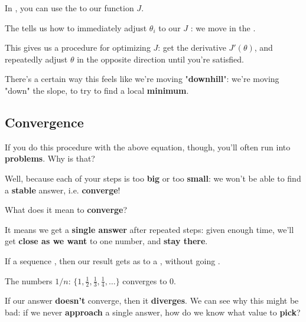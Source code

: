         \begin{concept}
            In , you can use the  to  our function $J$.
            
            The  tells us how to immediately adjust $\theta_i$ to  our $J$ : we move in the .
        \end{concept}
        
        This gives us a procedure for optimizing $J$: get the derivative $J'(\theta)$, and repeatedly adjust $\theta$ in the opposite direction until you're satisfied.
        
        There's a certain way this feels like we're moving "\textbf{downhill}": we're moving "down" the slope, to try to find a local \textbf{minimum}.
        
    \subsection{Convergence}
    
        If you do this procedure with the above equation, though, you'll often run into \textbf{problems}. Why is that?
        
        Well, because each of your steps is too \textbf{big} or too \textbf{small}: we won't be able to find a \textbf{stable} answer, i.e. \textbf{converge}!
        
        What does it mean to \textbf{converge}? 
        
        It means we get a \textbf{single answer} after repeated steps: given enough time, we'll get \textbf{close as we want} to one number, and \textbf{stay there}.\\
        
        \begin{definition}
            If a sequence , then our result gets as  to a , without going .
        \end{definition}
        
        \miniex The numbers $1/n$: $\{ 1, \frac{1}{2}, \frac{1}{3}, \frac{1}{4}, \dots  \}$ converges to 0.
        
        If our answer \textbf{doesn't} converge, then it \textbf{diverges}. We can see why this might be bad: if we never \textbf{approach} a single answer, how do we know what value to \textbf{pick}?
        
